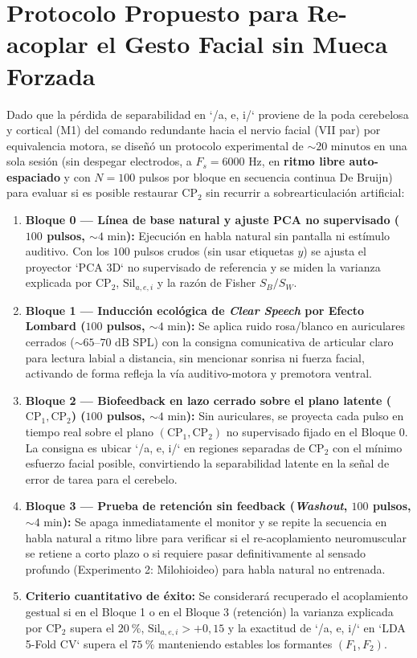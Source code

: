 \documentclass[11pt,a4paper]{article}
\begin{document}
\section{Protocolo Propuesto para Re-acoplar el Gesto Facial sin Mueca Forzada}

Dado que la p\'erdida de separabilidad en `/a, e, i/` proviene de la poda cerebelosa y cortical (M1) del comando redundante hacia el nervio facial (VII par) por equivalencia motora, se dise\~n\'o un protocolo experimental de $\sim 20\text{ minutos}$ en una sola sesi\'on (sin despegar electrodos, a $F_s = 6000\text{ Hz}$, en \textbf{ritmo libre auto-espaciado} y con $N=100$ pulsos por bloque en secuencia continua De Bruijn) para evaluar si es posible restaurar $\text{CP}_2$ sin recurrir a sobrearticulaci\'on artificial:

\begin{enumerate}
    \item \textbf{Bloque 0 --- L\'inea de base natural y ajuste PCA no supervisado ($100$ pulsos, $\sim 4\text{ min}$):} Ejecuci\'on en habla natural sin pantalla ni est\'imulo auditivo. Con los $100$ pulsos crudos (sin usar etiquetas $y$) se ajusta el proyector `PCA 3D` no supervisado de referencia y se miden la varianza explicada por $\text{CP}_2$, $\text{Sil}_{a,e,i}$ y la raz\'on de Fisher $S_B / S_W$.
    \item \textbf{Bloque 1 --- Inducci\'on ecol\'ogica de \textit{Clear Speech} por Efecto Lombard ($100$ pulsos, $\sim 4\text{ min}$):} Se aplica ruido rosa/blanco en auriculares cerrados ($\sim 65\text{--}70\text{ dB SPL}$) con la consigna comunicativa de articular claro para lectura labial a distancia, sin mencionar sonrisa ni fuerza facial, activando de forma refleja la v\'ia auditivo-motora y premotora ventral.
    \item \textbf{Bloque 2 --- Biofeedback en lazo cerrado sobre el plano latente ($\text{CP}_1, \text{CP}_2$) ($100$ pulsos, $\sim 4\text{ min}$):} Sin auriculares, se proyecta cada pulso en tiempo real sobre el plano $(\text{CP}_1, \text{CP}_2)$ no supervisado fijado en el Bloque 0. La consigna es ubicar `/a, e, i/` en regiones separadas de $\text{CP}_2$ con el m\'inimo esfuerzo facial posible, convirtiendo la separabilidad latente en la se\~nal de error de tarea para el cerebelo.
    \item \textbf{Bloque 3 --- Prueba de retenci\'on sin feedback (\textit{Washout}, $100$ pulsos, $\sim 4\text{ min}$):} Se apaga inmediatamente el monitor y se repite la secuencia en habla natural a ritmo libre para verificar si el re-acoplamiento neuromuscular se retiene a corto plazo o si requiere pasar definitivamente al sensado profundo (Experimento 2: Milohioideo) para habla natural no entrenada.
    \item \textbf{Criterio cuantitativo de \'exito:} Se considerar\'a recuperado el acoplamiento gestual si en el Bloque 1 o en el Bloque 3 (retenci\'on) la varianza explicada por $\text{CP}_2$ supera el $20\ \%$, $\text{Sil}_{a,e,i} > +0{,}15$ y la exactitud de `/a, e, i/` en `LDA 5-Fold CV` supera el $75\ \%$ manteniendo estables los formantes $(F_1, F_2)$.
\end{enumerate}
\end{document}
